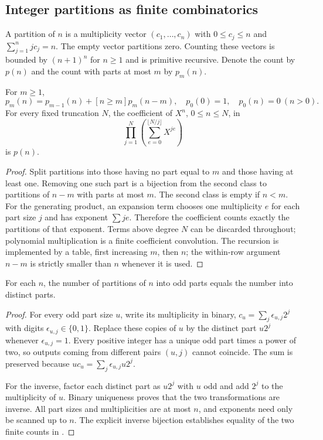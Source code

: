 \subsection{Integer partitions as finite combinatorics}
A partition of $n$ is a multiplicity vector $(c_1,\ldots,c_n)$ with $0\le c_j\le n$ and $\sum_{j=1}^n j c_j=n$. The empty vector partitions zero. Counting these vectors is bounded by $(n+1)^n$ for $n\ge1$ and is primitive recursive. Denote the count by $p(n)$ and the count with parts at most $m$ by $p_m(n)$.

\begin{theorem}\label{ag:partitionrec}
For $m\ge1$,
\[
 p_m(n)=p_{m-1}(n)+[n\ge m]p_m(n-m),
 \quad p_0(0)=1,\quad p_0(n)=0\ (n>0).
\]
For every fixed truncation $N$, the coefficient of $X^n$, $0\le n\le N$, in
\[
 \prod_{j=1}^N\left(\sum_{e=0}^{\lfloor N/j\rfloor}X^{je}\right)
\]
is $p(n)$.
\end{theorem}
\begin{proof}
Split partitions into those having no part equal to $m$ and those having at least one. Removing one such part is a bijection from the second class to partitions of $n-m$ with parts at most $m$. The second class is empty if $n<m$. For the generating product, an expansion term chooses one multiplicity $e$ for each part size $j$ and has exponent $\sum je$. Therefore the coefficient counts exactly the partitions of that exponent. Terms above degree $N$ can be discarded throughout; polynomial multiplication is a finite coefficient convolution. The recursion is implemented by a table, first increasing $m$, then $n$; the within-row argument $n-m$ is strictly smaller than $n$ whenever it is used.
\end{proof}

\begin{theorem}\label{ag:oddpartitions}
For each $n$, the number of partitions of $n$ into odd parts equals the number into distinct parts.
\end{theorem}
\begin{proof}
For every odd part size $u$, write its multiplicity in binary, $c_u=\sum_j\epsilon_{u,j}2^j$ with digits $\epsilon_{u,j}\in\{0,1\}$. Replace these copies of $u$ by the distinct part $u2^j$ whenever $\epsilon_{u,j}=1$. Every positive integer has a unique odd part times a power of two, so outputs coming from different pairs $(u,j)$ cannot coincide. The sum is preserved because $u c_u=\sum_j\epsilon_{u,j}u2^j$.

For the inverse, factor each distinct part as $u2^j$ with $u$ odd and add $2^j$ to the multiplicity of $u$. Binary uniqueness proves that the two transformations are inverse. All part sizes and multiplicities are at most $n$, and exponents need only be scanned up to $n$. The explicit inverse bijection establishes equality of the two finite counts in \ipra.
\end{proof}

